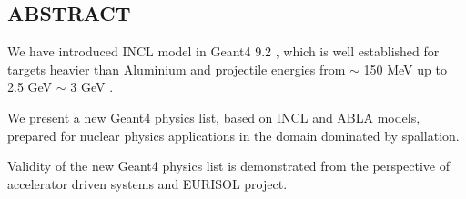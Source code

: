 \documentclass[20pt]{article}
\newenvironment{textbox}
{\begin{lrbox}{\dummybox}\begin{minipage}{0.9\columnwidth}}
{\end{minipage}\end{lrbox}\raisebox{-\depth}{\psshadowbox[framesep=1em,framearc=.1,shadow=true]{\usebox{\dummybox}}}\vspace{0.005\textheight}}
\begin{document}
\begin{center}
\vspace{-2cm}
\begin{multicols}{3}

\begin{textbox}

\section*{{\Huge {\sf ABSTRACT}}}


We have introduced INCL \cite{incl} model in {\sf Geant4 9.2} \cite{g4},
which is well established for targets heavier than Aluminium
and projectile energies from $\sim$ 150 MeV up to 2.5 GeV $\sim$ 3 GeV \cite{pk08bProceedings}. 

\vspace{1cm}
{\color{udsect}
We present a new {\sf Geant4} physics list, based on INCL and ABLA models, 
prepared for nuclear physics applications
in the domain dominated by spallation.
}

\vspace{1cm}
Validity of the new {\sf Geant4} physics list 
is demonstrated from the perspective of accelerator driven systems
and EURISOL project.


\end{textbox}

\end{multicols}
\end{center}
\end{document}
